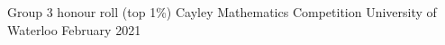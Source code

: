 
\begin{cvhonors}

  \cvhonor
    {Group 3 honour roll (top 1\%)} %
    {Cayley Mathematics Competition} %
    {University of Waterloo} %
    {February 2021} %

\end{cvhonors}
